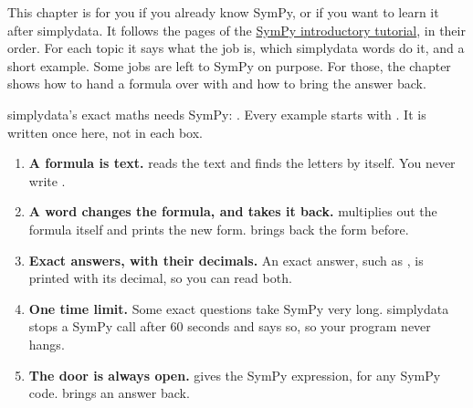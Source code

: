 

This chapter is for you if you already know SymPy, or if you want to learn it after simplydata. It
follows the pages of the
\href{https://docs.sympy.org/latest/tutorials/intro-tutorial/index.html}{SymPy introductory tutorial},
in their order. For each topic it says what the job is, which simplydata words do it, and a short
example. Some jobs are left to SymPy on purpose. For those, the chapter shows how to hand a formula
over with  and how to bring the answer back.

simplydata's exact maths needs SymPy: . Every example starts
with . It is written once here, not in each box.


\begin{enumerate}
  \item \textbf{A formula is text.}  reads the text and finds the
    letters by itself. You never write .
  \item \textbf{A word changes the formula, and  takes it back.} 
    multiplies out the formula itself and prints the new form.  brings back the
    form before.
  \item \textbf{Exact answers, with their decimals.} An exact answer, such as , is printed
    with its decimal, so you can read both.
  \item \textbf{One time limit.} Some exact questions take SymPy very long. simplydata stops a SymPy
    call after 60 seconds and says so, so your program never hangs.
  \item \textbf{The door is always open.}  gives the SymPy expression,
    for any SymPy code.  brings an answer back.
\end{enumerate}

